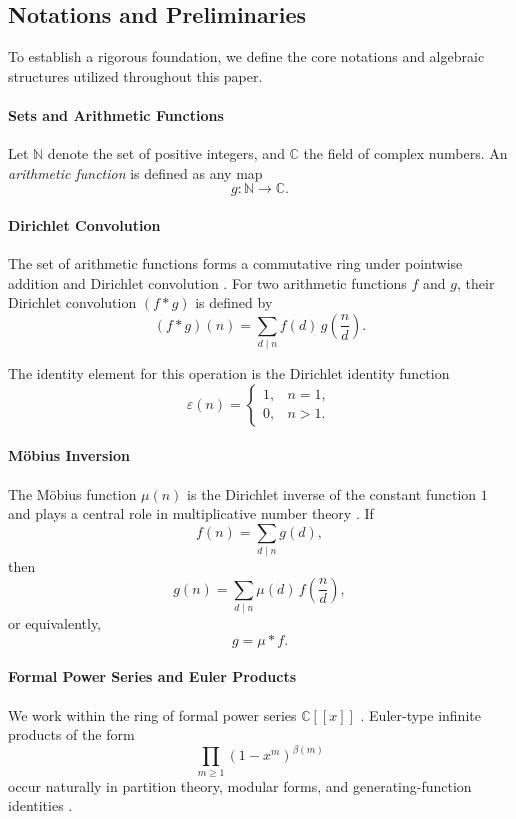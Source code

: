 \documentclass[11pt, a4paper]{article}
\theoremstyle{remark}
\begin{document}
\subsection{Notations and Preliminaries}

To establish a rigorous foundation, we define the core notations and algebraic structures utilized throughout this paper.

\paragraph{Sets and Arithmetic Functions}
Let $\mathbb{N}$ denote the set of positive integers, and $\mathbb{C}$ the field of complex numbers. An \emph{arithmetic function} is defined as any map
\[
g:\mathbb{N}\to\mathbb{C}.
\]

\paragraph{Dirichlet Convolution}
The set of arithmetic functions forms a commutative ring under pointwise addition and Dirichlet convolution \cite{Apostol1976}. For two arithmetic functions $f$ and $g$, their Dirichlet convolution $(f*g)$ is defined by
\[
(f*g)(n)
=
\sum_{d\mid n}
f(d)\,
g\!\left(\frac{n}{d}\right).
\]

The identity element for this operation is the Dirichlet identity function
\[
\varepsilon(n)
=
\begin{cases}
1, & n=1,\\
0, & n>1.
\end{cases}
\]

\paragraph{Möbius Inversion}
The Möbius function $\mu(n)$ is the Dirichlet inverse of the constant function $1$ and plays a central role in multiplicative number theory \cite{Apostol1976,HardyWright2008}. If
\[
f(n)=\sum_{d\mid n} g(d),
\]
then
\[
g(n)=\sum_{d\mid n}\mu(d)\,f\!\left(\frac{n}{d}\right),
\]
or equivalently,
\[
g=\mu * f.
\]

\paragraph{Formal Power Series and Euler Products}
We work within the ring of formal power series $\mathbb{C}[[x]]$ \cite{Stanley1999}. Euler-type infinite products of the form
\[
\prod_{m\ge1}(1-x^m)^{\beta(m)}
\]
occur naturally in partition theory, modular forms, and generating-function identities \cite{Andrews1976}.
\end{document}
